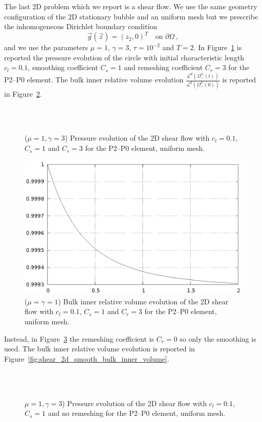 \documentclass[a4paper,12pt,onecolumn]{article}
\begin{document}
The last 2D problem which we report is a shear flow. We use the same geometry configuration of the 2D stationary bubble and an uniform mesh but we prescribe the inhomogeneous Dirichlet boundary condition
\begin{equation*}
\vec g(\vec z)=(z_2,0)^T\quad \mbox{on }\partial\Omega\,,
\end{equation*}
and we use the parameters $\mu=1$, $\gamma=3$, $\tau=10^{-2}$ and $T=2$. In Figure~\ref{fig:shear_2d} is reported the pressure evolution of the circle with initial characteristic length $c_l=0.1$, smoothing coefficient $C_s=1$ and remeshing coefficient $C_r=3$ for the P2--P0 element. The bulk inner relative volume evolution $\frac{\mathcal{L}^d(\Omega^h_-(t))}{\mathcal{L}^d(\Omega^h_-(0))}$ is reported in Figure~\ref{fig:shear_2d_bulk_inner_volume}.
\begin{figure}[htbp]
  \centering
  \quad
  \\
  \quad
  \\
  \caption{($\mu=1,\gamma=3$) Pressure evolution of the 2D shear flow with $c_l=0.1$, $C_s=1$ and $C_r=3$ for the P2--P0 element, uniform mesh.}
  \label{fig:shear_2d}
\end{figure}

\begin{figure}[htbp]
  \centering
  \includegraphics[width=.45\textwidth]{images/2d_shear_bulk_inner_volume.ps}
  \caption{($\mu=\gamma=1$) Bulk inner relative volume evolution of the 2D shear flow with $c_l=0.1$, $C_s=1$ and $C_r=3$ for the P2--P0 element, uniform mesh.}
  \label{fig:shear_2d_bulk_inner_volume}
\end{figure}

Instead, in Figure~\ref{fig:shear_2d_smooth} the remeshing coefficient is $C_r=0$ so only the smoothing is used. The bulk inner relative volume evolution is reported in Figure~\ref{fig:shear_2d_smooth_bulk_inner_volume}.
\begin{figure}[htbp]
  \centering
  \quad
  \\
  \quad
  \\
  \caption{$\mu=1,\gamma=3$) Pressure evolution of the 2D shear flow with $c_l=0.1$, $C_s=1$ and no remeshing for the P2--P0 element, uniform mesh.}
  \label{fig:shear_2d_smooth}
\end{figure}
\end{document}
